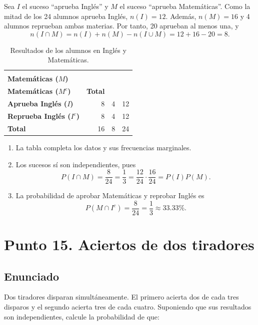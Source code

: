 \documentclass[12pt]{article}
\begin{document}
Sea $I$ el suceso ``aprueba Inglés'' y $M$ el suceso ``aprueba Matemáticas''. Como la mitad de los 24 alumnos aprueba Inglés, $n(I)=12$. Además, $n(M)=16$ y 4 alumnos reprueban ambas materias. Por tanto, 20 aprueban al menos una, y
\[
n(I\cap M)=n(I)+n(M)-n(I\cup M)=12+16-20=8.
\]

\begin{table}[H]
\centering
\small
\renewcommand{\arraystretch}{1.15}
\begin{tabular}{|l|r|r|r|}
\hline
 & \shortstack{\textbf{Aprueba}\\\textbf{Matemáticas ($M$)}} & \shortstack{\textbf{Reprueba}\\\textbf{Matemáticas ($M^c$)}} & \textbf{Total} \\ \hline
\textbf{Aprueba Inglés ($I$)} & 8 & 4 & 12 \\ \hline
\textbf{Reprueba Inglés ($I^c$)} & 8 & 4 & 12 \\ \hline
\textbf{Total} & 16 & 8 & 24 \\ \hline
\end{tabular}
\caption{Resultados de los alumnos en Inglés y Matemáticas.}
\label{tab:aprobacion-ingles-matematicas}
\end{table}

\begin{enumerate}
    \item La tabla completa los datos y sus frecuencias marginales.
    \item Los sucesos sí son independientes, pues
    \[
    P(I\cap M)=\frac{8}{24}=\frac{1}{3}
    =\frac{12}{24}\cdot\frac{16}{24}=P(I)P(M).
    \]
    \item La probabilidad de aprobar Matemáticas y reprobar Inglés es
    \[
    P(M\cap I^c)=\frac{8}{24}=\frac{1}{3}\approx33.33\%.
    \]
\end{enumerate}

\section*{Punto 15. Aciertos de dos tiradores}

\subsection*{Enunciado}

Dos tiradores disparan simultáneamente. El primero acierta dos de cada tres disparos y el segundo acierta tres de cada cuatro. Suponiendo que sus resultados son independientes, calcule la probabilidad de que:
\end{document}
